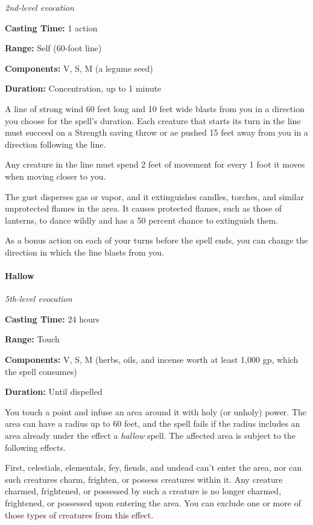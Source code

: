 \documentclass[
]{article}
\begin{document}
\emph{2nd-level evocation}

\textbf{Casting Time:} 1 action

\textbf{Range:} Self (60-foot line)

\textbf{Components:} V, S, M (a legume seed)

\textbf{Duration:} Concentration, up to 1 minute

A line of strong wind 60 feet long and 10 feet wide blasts from you in a
direction you choose for the spell's duration. Each creature that starts
its turn in the line must succeed on a Strength saving throw or ae
pushed 15 feet away from you in a direction following the line.

Any creature in the line must spend 2 feet of movement for every 1 foot
it moves when moving closer to you.

The gust disperses gas or vapor, and it extinguishes candles, torches,
and similar unprotected flames in the area. It causes protected flames,
such as those of lanterns, to dance wildly and has a 50 percent chance
to extinguish them.

As a bonus action on each of your turns before the spell ends, you can
change the direction in which the line blasts from you.

\hypertarget{hallow}{%
\paragraph{Hallow}\label{hallow}}

\emph{5th-level evocation}

\textbf{Casting Time:} 24 hours

\textbf{Range:} Touch

\textbf{Components:} V, S, M (herbs, oils, and incense worth at least
1,000 gp, which the spell consumes)

\textbf{Duration:} Until dispelled

You touch a point and infuse an area around it with holy (or unholy)
power. The area can have a radius up to 60 feet, and the spell fails if
the radius includes an area already under the effect a \emph{hallow}
spell. The affected area is subject to the following effects.

First, celestials, elementals, fey, fiends, and undead can't enter the
area, nor can such creatures charm, frighten, or possess creatures
within it. Any creature charmed, frightened, or possessed by such a
creature is no longer charmed, frightened, or possessed upon entering
the area. You can exclude one or more of those types of creatures from
this effect.
\end{document}
